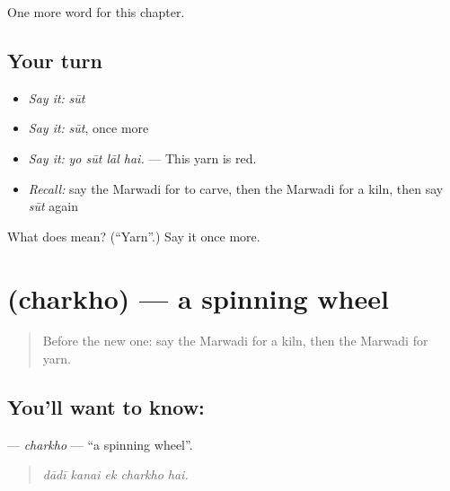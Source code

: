 \begin{grammarlens}[title={What you've built}]
One more word for this chapter.
\end{grammarlens}

\subsection*{Your turn}
\begin{itemize}
\raggedright
  \item \emph{Say it:} \emph{sūt}
  \item \emph{Say it:} \emph{sūt}, once more
  \item \emph{Say it:} \emph{yo sūt lāl hai.} — This yarn is red.
  \item \emph{Recall:} say the Marwadi for to carve, then the Marwadi for a kiln, then say \emph{sūt} again
\end{itemize}

\begin{tcolorbox}[breakable,colback=teal!4,colframe=teal!35!black,title={Before you move on}]
What does  mean? (\textquotedblleft{}Yarn\textquotedblright{}.) Say it once more.
\end{tcolorbox}
\section[\texorpdfstring{\mw{चरखो} (charkho)}{चरखो (charkho)}]{ (charkho) — a spinning wheel}

\label{lesson:MW-C282-charkho}



\begin{quote}
Before the new one: say the Marwadi for a kiln, then the Marwadi for yarn.
\end{quote}

\subsection*{You'll want to know: }
\textbf{} — \emph{charkho} — \textquotedblleft{}a spinning wheel\textquotedblright{}.

\begin{quote}
    
\end{quote}

\begin{quote}
\emph{dādī kanai ek charkho hai.}
\end{quote}

